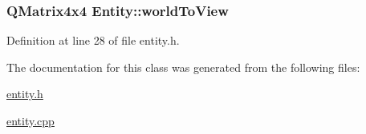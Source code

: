 \subsubsection[{world\+To\+View}]{\setlength{\rightskip}{0pt plus 5cm}Q\+Matrix4x4 Entity\+::world\+To\+View\hspace{0.3cm}{\ttfamily [protected]}}\label{class_entity_ad9ec1327cacd74787dd951ff4389ca15}


Definition at line 28 of file entity.\+h.



The documentation for this class was generated from the following files\+:\begin{DoxyCompactItemize}
\item 
\hyperlink{entity_8h}{entity.\+h}\item 
\hyperlink{entity_8cpp}{entity.\+cpp}\end{DoxyCompactItemize}
